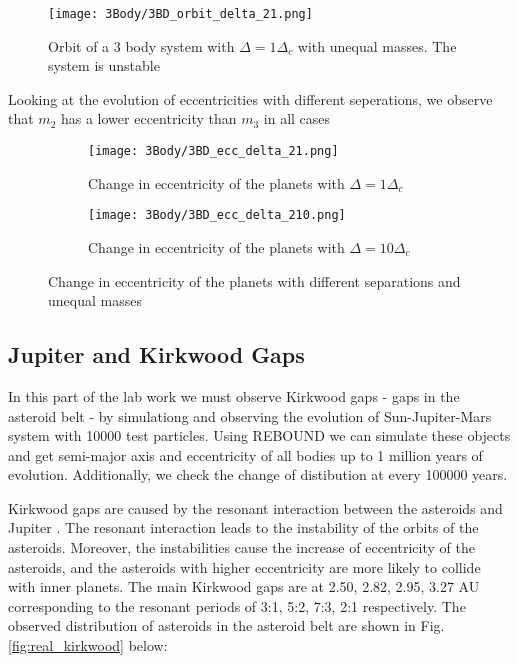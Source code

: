 \documentclass[12pt,a4paper]{article}
\begin{document}
\begin{figure}
  \centering
  \texttt{[image: 3Body/3BD\_orbit\_delta\_21.png]}
  \caption{Orbit of a 3 body system with $\Delta = 1\Delta_c$ with unequal masses. The system is unstable}
\end{figure}

Looking at the evolution of eccentricities with different seperations, we observe that $m_2$ has a lower eccentricity than $m_3$ in all cases
\begin{figure}[H]
  \centering
  \begin{subfigure}{0.49\textwidth}
    \centering
    \texttt{[image: 3Body/3BD\_ecc\_delta\_21.png]}
    \caption{Change in eccentricity of the planets with $\Delta = 1\Delta_c$}
  \end{subfigure}
  \begin{subfigure}{0.49\textwidth}
    \centering
    \texttt{[image: 3Body/3BD\_ecc\_delta\_210.png]}
    \caption{Change in eccentricity of the planets with $\Delta = 10\Delta_c$}
  \end{subfigure}
  \caption{Change in eccentricity of the planets with different separations and unequal masses}
\end{figure}
\subsection{Jupiter and Kirkwood Gaps}
\label{sec:kirkwood}
In this part of the lab work we must observe Kirkwood gaps - gaps in the asteroid belt - by simulationg and observing the evolution of Sun-Jupiter-Mars system with 10000 test particles. 
Using REBOUND we can simulate these objects and get semi-major axis and eccentricity of all bodies up to 1 million years of evolution. Additionally, we check the change of distibution at every 100000 years.

Kirkwood gaps are caused by the resonant interaction between the asteroids and Jupiter \cite{asteroids}. The resonant interaction leads to the instability of the orbits of the asteroids.
Moreover, the instabilities cause the increase of eccentricity of the asteroids, and the asteroids with higher eccentricity are more likely to collide with inner planets.
The main Kirkwood gaps are at 2.50, 2.82, 2.95, 3.27 AU corresponding to the resonant periods of 3:1, 5:2, 7:3, 2:1 respectively.
The observed distribution of asteroids in the asteroid belt are shown in Fig. \ref{fig:real_kirkwood} below:
\end{document}
